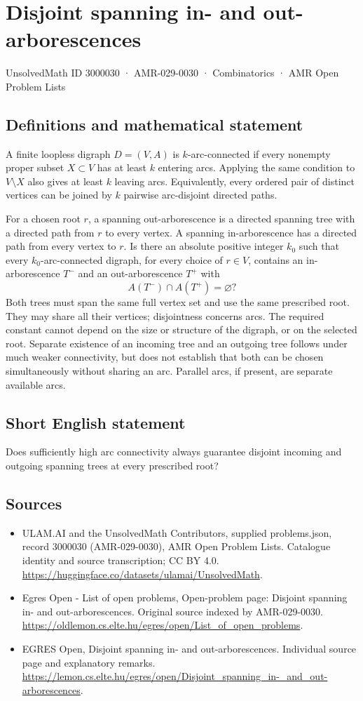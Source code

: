 \documentclass[11pt,a4paper]{article}
\begin{document}
\section*{Disjoint spanning in- and out-arborescences}\label{3000030}
{\small UnsolvedMath ID 3000030 · AMR-029-0030 · Combinatorics · AMR Open Problem Lists}
\subsection{Definitions and mathematical statement}
A finite loopless digraph $D=(V,A)$ is $k$-arc-connected if every
nonempty proper subset $X\subset V$ has at least $k$ entering arcs.
Applying the same condition to $V\setminus X$ also gives at least
$k$ leaving arcs. Equivalently, every ordered pair of distinct vertices
can be joined by $k$ pairwise arc-disjoint directed paths.

For a chosen root $r$, a spanning out-arborescence is a directed spanning
tree with a directed path from $r$ to every vertex. A spanning
in-arborescence has a directed path from every vertex to $r$.
Is there an absolute positive integer $k_0$ such that every
$k_0$-arc-connected digraph, for every choice of $r\in V$, contains
an in-arborescence $T^-$ and an out-arborescence $T^+$ with
\[
                             A(T^-)\cap A(T^+)=\varnothing?
\]
Both trees must span the same full vertex set and use the same prescribed
root. They may share all their vertices; disjointness concerns arcs.
The required constant cannot depend on the size or structure of the
digraph, or on the selected root. Separate existence of an incoming
tree and an outgoing tree follows under much weaker connectivity,
but does not establish that both can be chosen simultaneously without
sharing an arc. Parallel arcs, if present, are separate available arcs.
\subsection{Short English statement}
Does sufficiently high arc connectivity always guarantee disjoint
incoming and outgoing spanning trees at every prescribed root?
\subsection{Sources}
\begin{itemize}
\item[S1] ULAM.AI and the UnsolvedMath Contributors, supplied problems.json, record 3000030 (AMR-029-0030), AMR Open Problem Lists. Catalogue identity and source transcription; CC BY 4.0.
\url{https://huggingface.co/datasets/ulamai/UnsolvedMath}.
\item[S2] Egres Open - List of open problems, Open-problem page: Disjoint spanning in- and out-arborescences. Original source indexed by AMR-029-0030.
\url{https://oldlemon.cs.elte.hu/egres/open/List_of_open_problems}.
\item[S3] EGRES Open, Disjoint spanning in- and out-arborescences. Individual source page and explanatory remarks.
\url{https://lemon.cs.elte.hu/egres/open/Disjoint_spanning_in-_and_out-arborescences}.
\end{itemize}
\end{document}
